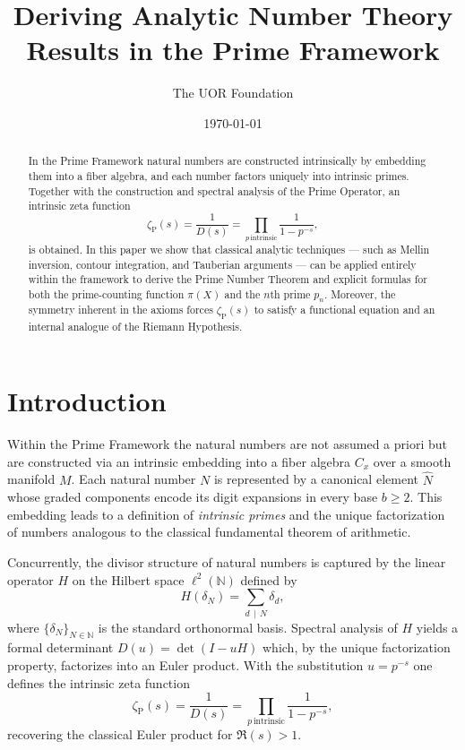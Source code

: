 \documentclass{article}
\begin{document}
\title{Deriving Analytic Number Theory Results in the Prime Framework}
\author{The UOR Foundation}
\date{\today}
\maketitle

\begin{abstract}
  In the Prime Framework natural numbers are constructed intrinsically by embedding them into a fiber algebra, and each number factors uniquely into intrinsic primes. Together with the construction and spectral analysis of the Prime Operator, an intrinsic zeta function
  \[
  \zeta_{\mathrm{P}}(s) = \frac{1}{D(s)} = \prod_{p\,\text{intrinsic}} \frac{1}{1-p^{-s}},
  \]
  is obtained. In this paper we show that classical analytic techniques --- such as Mellin inversion, contour integration, and Tauberian arguments --- can be applied entirely within the framework to derive the Prime Number Theorem and explicit formulas for both the prime-counting function \(\pi(X)\) and the \(n\)th prime \(p_n\). Moreover, the symmetry inherent in the axioms forces \(\zeta_{\mathrm{P}}(s)\) to satisfy a functional equation and an internal analogue of the Riemann Hypothesis.
\end{abstract}

\section{Introduction}
Within the Prime Framework the natural numbers are not assumed a priori but are constructed via an intrinsic embedding into a fiber algebra \(C_x\) over a smooth manifold \(M\). Each natural number \(N\) is represented by a canonical element \(\widehat{N}\) whose graded components encode its digit expansions in every base \(b\ge2\). This embedding leads to a definition of \emph{intrinsic primes} and the unique factorization of numbers analogous to the classical fundamental theorem of arithmetic.

Concurrently, the divisor structure of natural numbers is captured by the linear operator \(H\) on the Hilbert space \(\ell^2(\mathbb{N})\) defined by
\[
H(\delta_N) = \sum_{d\,\mid\,N} \delta_d,
\]
where \(\{\delta_N\}_{N\in\mathbb{N}}\) is the standard orthonormal basis. Spectral analysis of \(H\) yields a formal determinant \(D(u)=\det(I-uH)\) which, by the unique factorization property, factorizes into an Euler product. With the substitution \(u=p^{-s}\) one defines the intrinsic zeta function
\[
\zeta_{\mathrm{P}}(s)=\frac{1}{D(s)}=\prod_{p\,\text{intrinsic}} \frac{1}{1-p^{-s}},
\]
recovering the classical Euler product for \(\Re(s)>1\).
\end{document}
